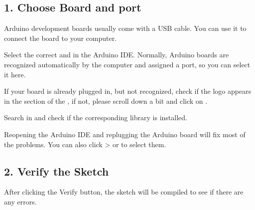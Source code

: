 \documentclass[a4paper,11pt,english]{sphinxmanual}
\begin{document}
\subsection{1. Choose Board and port}
\label{\detokenize{Get_Started_with_Arduino/How_to_Upload_Sketch:choose-board-and-port}}
\sphinxAtStartPar
Arduino development boards usually come with a USB cable. You can use it to connect the board to your computer.

\sphinxAtStartPar
Select the correct  and  in the Arduino IDE. Normally, Arduino boards are recognized automatically by the computer and assigned a port, so you can select it here.
\begin{quote}

\noindent{}
\end{quote}

\sphinxAtStartPar
If your board is already plugged in, but not recognized, check if the  logo appears in the  section of the , if not, please scroll down a bit and click on .

\sphinxAtStartPar
Search  in  and check if the corresponding library is installed.
\begin{quote}

\noindent{}
\end{quote}

\sphinxAtStartPar
Reopening the Arduino IDE and re\sphinxhyphen{}plugging the Arduino board will fix most of the problems. You can also click  \sphinxhyphen{}\textgreater{}  or  to select them.
\begin{quote}

\noindent{}

\noindent{}
\end{quote}


\subsection{2. Verify the Sketch}
\label{\detokenize{Get_Started_with_Arduino/How_to_Upload_Sketch:verify-the-sketch}}
\sphinxAtStartPar
After clicking the Verify button, the sketch will be compiled to see if there are any errors.
\begin{quote}

\noindent{}
\end{quote}
\end{document}
